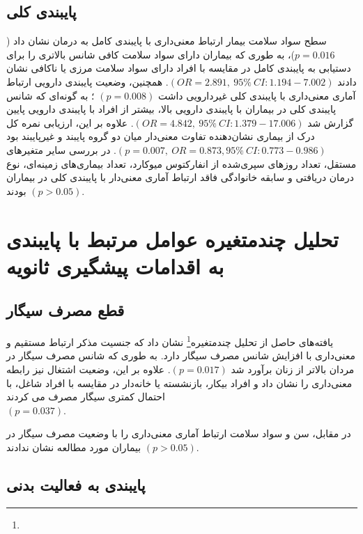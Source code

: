 

\subsection*{\textbf{پایبندی کلی}}


سطح سواد سلامت بیمار ارتباط معنی‌داری با پایبندی کامل به درمان نشان داد (\(p=0.016\))، به طوری که بیماران دارای سواد سلامت کافی شانس بالاتری را برای دستیابی به پایبندی کامل در مقایسه با افراد دارای سواد سلامت مرزی یا ناکافی نشان دادند $(OR=2.891, \ 95\% \ CI:1.194-7.002)$. همچنین، وضعیت پایبندی دارویی ارتباط آماری معنی‌داری با پایبندی کلی غیردارویی داشت $(p=0.008)$ ؛ به گونه‌ای که شانس پایبندی کلی در بیماران با پایبندی دارویی بالا، بیشتر از افراد با پایبندی دارویی پایین گزارش شد $(OR=4.842, \ 95\% \ CI:1.379-17.006)$. علاوه بر این، ارزیابی نمره کل درک از بیماری نشان‌دهنده تفاوت معنی‌دار میان دو گروه پایبند و غیرپایبند بود $(p=0.007, \ OR=0.873, 95\% \ CI:0.773-0.986)$. در بررسی سایر متغیرهای مستقل، تعداد روزهای سپری‌شده از انفارکتوس میوکارد، تعداد بیماری‌های زمینه‌ای، نوع درمان دریافتی و سابقه خانوادگی فاقد ارتباط آماری معنی‌دار با پایبندی کلی در بیماران بودند $(p>0.05)$.



\section{تحلیل چندمتغیره عوامل مرتبط با پایبندی به اقدامات پیشگیری ثانویه}

\subsection*{\textbf{قطع مصرف سیگار}}

یافته‌های حاصل از تحلیل چندمتغیره\footnote{} نشان داد که جنسیت مذکر ارتباط مستقیم و معنی‌داری با افزایش شانس مصرف سیگار دارد. به طوری که شانس مصرف سیگار در مردان بالاتر از زنان برآورد شد $(p=0.017)$. علاوه بر این، وضعیت اشتغال نیز رابطه معنی‌داری را نشان داد و افراد بیکار، بازنشسته یا خانه‌دار در مقایسه با افراد شاغل، با احتمال کمتری سیگار مصرف می کردند \\$(p=0.037)$.

در مقابل، سن و سواد سلامت ارتباط آماری معنی‌داری را با وضعیت مصرف سیگار در بیماران مورد مطالعه نشان ندادند $(p>0.05)$.



\subsection*{\textbf{پایبندی به فعالیت بدنی}}


